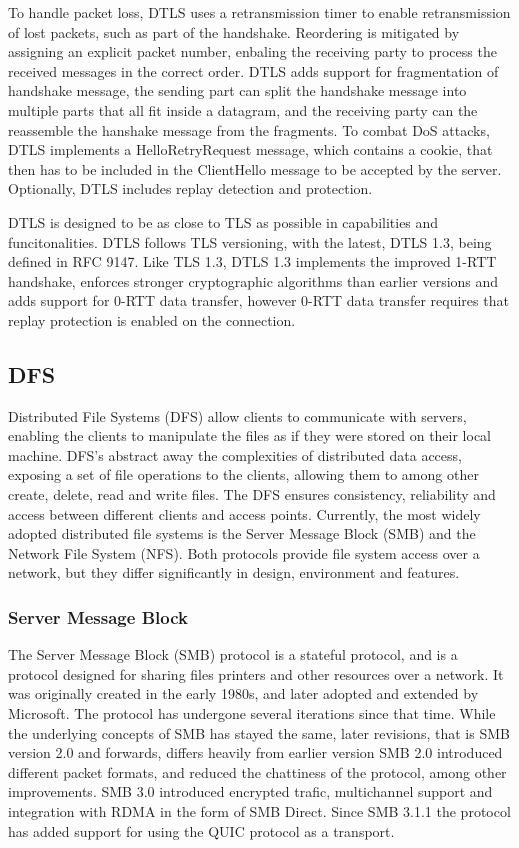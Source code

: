 \documentclass[english, 12pt, a4paper, elec, utf8, a-2b, online]{aaltothesis}
\begin{document}
To handle packet loss, DTLS uses a retransmission timer to enable retransmission of
lost packets, such as part of the handshake. Reordering is mitigated by assigning
an explicit packet number, enbaling the receiving party to process the received
messages in the correct order. DTLS adds support for fragmentation of handshake message,
the sending part can split the handshake message into multiple parts that all fit
inside a datagram, and the receiving party can the reassemble the hanshake message
from the fragments. To combat DoS attacks,  DTLS implements a HelloRetryRequest message,
which contains a cookie, that then has to be included in the ClientHello message
to be accepted by the server. Optionally, DTLS includes replay detection and protection\cite{rfc9147}.

DTLS is designed to be as close to TLS as possible in capabilities and funcitonalities.
DTLS follows TLS versioning, with the latest, DTLS 1.3, being defined in RFC 9147\cite{rfc9147}.
Like TLS 1.3, DTLS 1.3 implements the improved 1-RTT handshake, enforces stronger
cryptographic algorithms than earlier versions and adds support for 0-RTT data transfer,
however 0-RTT data transfer requires that replay protection is enabled on the connection\cite{rfc9147}.

\subsection{DFS}

Distributed File Systems (DFS) allow clients to communicate with servers, enabling
the clients to manipulate the files as if they were stored on their local machine.
DFS's abstract away the complexities of distributed data access, exposing a set
of file operations to the clients, allowing them to among other create, delete, read
and write files. The DFS ensures consistency, reliability and access between different
clients and access points\cite{os_concepts}. Currently, the most widely adopted
distributed file systems is the Server Message Block (SMB)\cite{smb2} and the
Network File System (NFS)\cite{rfc7530}. Both protocols provide file system access
over a network, but they differ significantly in design, environment and features.

\subsubsection{Server Message Block}

The Server Message Block (SMB) protocol is a stateful protocol, and is a protocol designed for
sharing files printers and other resources over a network. It was originally created
in the early 1980s, and later adopted and extended by Microsoft\cite{samba_myths}.
The protocol has undergone several iterations since that time. While the underlying
concepts of SMB has stayed the same, later revisions, that is SMB version 2.0 and forwards,
differs heavily from earlier version SMB 2.0 introduced different packet formats, and reduced
the chattiness of the protocol, among other improvements. SMB 3.0 introduced encrypted trafic,
multichannel support and integration with RDMA in the form of SMB Direct. Since SMB 3.1.1 the
protocol has added support for using the QUIC protocol as a transport\cite{smb2}.
\end{document}
